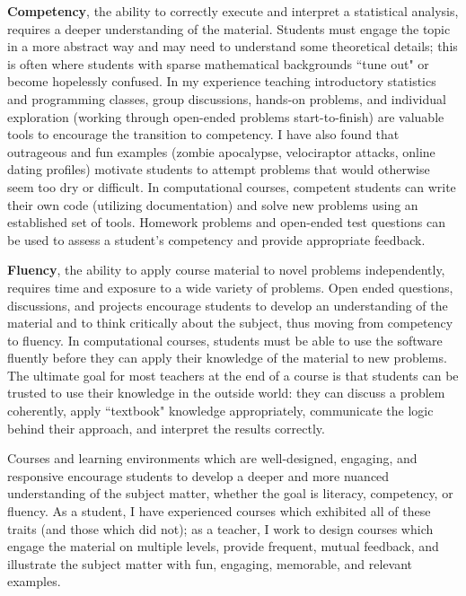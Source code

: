 \documentclass[11pt,letterpaper,sans,unicode]{moderncv}        %
\begin{document}
\textbf{Competency}, the ability to correctly execute and interpret a statistical analysis, requires a deeper understanding of the material. Students must engage the topic in a more abstract way and may need to understand some theoretical details; this is often where students with sparse mathematical backgrounds ``tune out" or become hopelessly confused. In my experience teaching introductory statistics and programming classes, group discussions, hands-on problems, and individual exploration (working through open-ended problems start-to-finish) are valuable tools to encourage the transition to competency. I have also found that outrageous and fun examples (zombie apocalypse, velociraptor attacks, online dating profiles) motivate students to attempt problems that would otherwise seem too dry or difficult. In computational courses, competent students can write their own code (utilizing documentation) and solve new problems using an established set of tools. Homework problems and open-ended test questions can be used to assess a student's competency and provide appropriate feedback. 

\textbf{Fluency}, the ability to apply course material to novel problems independently, requires time and exposure to a wide variety of problems. Open ended questions, discussions, and projects encourage students to develop an understanding of the material and to think critically about the subject, thus moving from competency to fluency. In computational courses, students must be able to use the software fluently before they can apply their knowledge of the material to new problems. The ultimate goal for most teachers at the end of a course is that students can be trusted to use their knowledge in the outside world: they can discuss a problem coherently, apply ``textbook" knowledge appropriately, communicate the logic behind their approach, and interpret the results correctly. 

\vfill\noindent Courses and learning environments which are well-designed, engaging, and responsive encourage students to develop a deeper and more nuanced understanding of the subject matter, whether the goal is literacy, competency, or fluency. As a student, I have experienced courses which exhibited all of these traits (and those which did not); as a teacher, I work to design courses which engage the material on multiple levels, provide frequent, mutual feedback, and illustrate the subject matter with fun, engaging, memorable, and relevant examples. 
\end{document}
